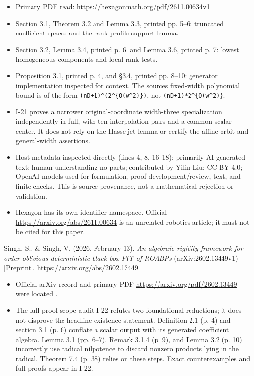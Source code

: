 \documentclass[11pt,a4paper]{article}
\providecommand{\tightlist}{\setlength{\itemsep}{0pt}\setlength{\parskip}{0pt}}
\theoremstyle{definition}\newtheorem{definition}{Definition}
\begin{document}
\begin{itemize}
\tightlist
\item
  Primary PDF read: \url{https://hexagonmath.org/pdf/2611.00634v1}
\item
  Section 3.1, Theorem 3.2 and Lemma 3.3, printed pp. 5--6: truncated
  coefficient spaces and the rank-profile support lemma.
\item
  Section 3.2, Lemma 3.4, printed p. 6, and Lemma 3.6, printed p. 7:
  lowest homogeneous components and local rank tests.
\item
  Proposition 3.1, printed p. 4, and §3.4, printed pp. 8--10: generator
  implementation inspected for context. The source\textquotesingle s
  fixed-width polynomial bound is of the form
  \texttt{(nD+1)\^{}(2\^{}\{O(w\^{}2)\})}, not
  \texttt{(nD+1)*2\^{}\{O(w\^{}2)\}}.
\item
  I-21 proves a narrower original-coordinate width-three specialization
  independently in full, with ten interpolation pairs and a common
  scalar center. It does not rely on the Hasse-jet lemma or certify the
  affine-orbit and general-width assertions.
\item
  Host metadata inspected directly (lines 4, 8, 16--18): primarily
  AI-generated text; human understanding no parts; contributed by Yilin
  Liu; CC BY 4.0; OpenAI models used for formulation, proof
  development/review, text, and finite checks. This is source
  provenance, not a mathematical rejection or validation.
\item
  Hexagon has its own identifier namespace. Official
  \url{https://arxiv.org/abs/2611.00634} is an unrelated robotics
  article; it must not be cited for this paper.
\end{itemize}

Singh, S., \& Singh, V. (2026, February 13). \emph{An algebraic rigidity
framework for order-oblivious deterministic black-box PIT of ROABPs}
(arXiv:2602.13449v1) {[}Preprint{]}.
\url{https://arxiv.org/abs/2602.13449}

\begin{itemize}
\tightlist
\item
  Official arXiv record and primary PDF
  \url{https://arxiv.org/pdf/2602.13449} were located .
\item
  The full proof-scope audit I-22 refutes two foundational reductions;
  it does not disprove the headline existence statement. Definition 2.1
  (p. 4) and section 3.1 (p. 6) conflate a scalar output with its
  generated coefficient algebra. Lemma 3.1 (pp. 6--7), Remark 3.1.4 (p.
  9), and Lemma 3.2 (p. 10) incorrectly use radical nilpotence to
  discard nonzero products lying in the radical. Theorem 7.4 (p. 38)
  relies on these steps. Exact counterexamples and full proofs appear in
  I-22.
\end{itemize}
\end{document}
